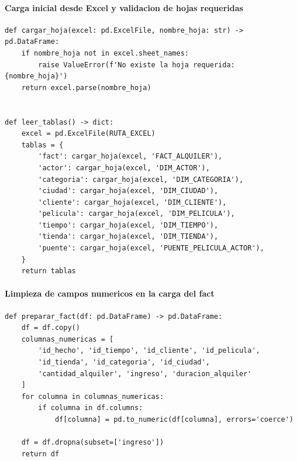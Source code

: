 ﻿\documentclass{article}
\begin{document}
\paragraph{Carga inicial desde Excel y validacion de hojas requeridas}
\begin{lstlisting}
def cargar_hoja(excel: pd.ExcelFile, nombre_hoja: str) -> pd.DataFrame:
    if nombre_hoja not in excel.sheet_names:
        raise ValueError(f'No existe la hoja requerida: {nombre_hoja}')
    return excel.parse(nombre_hoja)


def leer_tablas() -> dict:
    excel = pd.ExcelFile(RUTA_EXCEL)
    tablas = {
        'fact': cargar_hoja(excel, 'FACT_ALQUILER'),
        'actor': cargar_hoja(excel, 'DIM_ACTOR'),
        'categoria': cargar_hoja(excel, 'DIM_CATEGORIA'),
        'ciudad': cargar_hoja(excel, 'DIM_CIUDAD'),
        'cliente': cargar_hoja(excel, 'DIM_CLIENTE'),
        'pelicula': cargar_hoja(excel, 'DIM_PELICULA'),
        'tiempo': cargar_hoja(excel, 'DIM_TIEMPO'),
        'tienda': cargar_hoja(excel, 'DIM_TIENDA'),
        'puente': cargar_hoja(excel, 'PUENTE_PELICULA_ACTOR'),
    }
    return tablas
\end{lstlisting}

\paragraph{Limpieza de campos numericos en la carga del fact}
\begin{lstlisting}
def preparar_fact(df: pd.DataFrame) -> pd.DataFrame:
    df = df.copy()
    columnas_numericas = [
        'id_hecho', 'id_tiempo', 'id_cliente', 'id_pelicula',
        'id_tienda', 'id_categoria', 'id_ciudad',
        'cantidad_alquiler', 'ingreso', 'duracion_alquiler'
    ]
    for columna in columnas_numericas:
        if columna in df.columns:
            df[columna] = pd.to_numeric(df[columna], errors='coerce')

    df = df.dropna(subset=['ingreso'])
    return df
\end{lstlisting}
\end{document}
